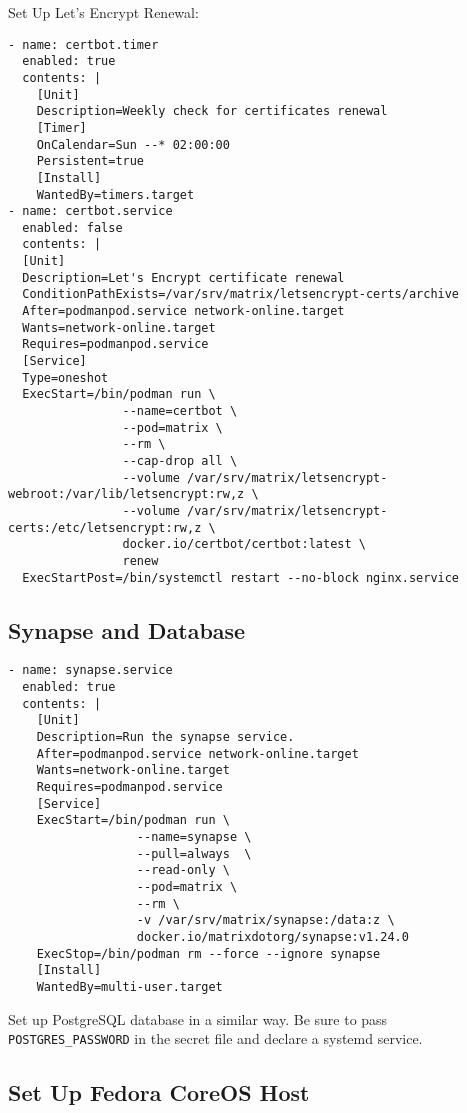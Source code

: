 \documentclass{article}
\begin{document}
Set Up Let's Encrypt Renewal: 
\begin{lstlisting}
- name: certbot.timer
  enabled: true
  contents: |
    [Unit]
    Description=Weekly check for certificates renewal
    [Timer]
    OnCalendar=Sun --* 02:00:00 
    Persistent=true
    [Install]
    WantedBy=timers.target
- name: certbot.service
  enabled: false
  contents: |
  [Unit]
  Description=Let's Encrypt certificate renewal
  ConditionPathExists=/var/srv/matrix/letsencrypt-certs/archive
  After=podmanpod.service network-online.target
  Wants=network-online.target
  Requires=podmanpod.service
  [Service]
  Type=oneshot
  ExecStart=/bin/podman run \
                --name=certbot \
                --pod=matrix \
                --rm \
                --cap-drop all \
                --volume /var/srv/matrix/letsencrypt-webroot:/var/lib/letsencrypt:rw,z \
                --volume /var/srv/matrix/letsencrypt-certs:/etc/letsencrypt:rw,z \
                docker.io/certbot/certbot:latest \
                renew
  ExecStartPost=/bin/systemctl restart --no-block nginx.service 
\end{lstlisting}

\subsection{Synapse and Database}
\begin{lstlisting}
- name: synapse.service       
  enabled: true       
  contents: |       
    [Unit]       
    Description=Run the synapse service.       
    After=podmanpod.service network-online.target                       
    Wants=network-online.target       
    Requires=podmanpod.service
    [Service]       
    ExecStart=/bin/podman run \
                  --name=synapse \       
                  --pull=always  \       
                  --read-only \       
                  --pod=matrix \       
                  --rm \       
                  -v /var/srv/matrix/synapse:/data:z \       
                  docker.io/matrixdotorg/synapse:v1.24.0       
    ExecStop=/bin/podman rm --force --ignore synapse       
    [Install]            
    WantedBy=multi-user.target
\end{lstlisting}

Set up PostgreSQL database in a similar way. Be sure to pass \lstinline{POSTGRES_PASSWORD} in the secret file and declare a systemd service. 


\subsection{Set Up Fedora CoreOS Host}
\end{document}
